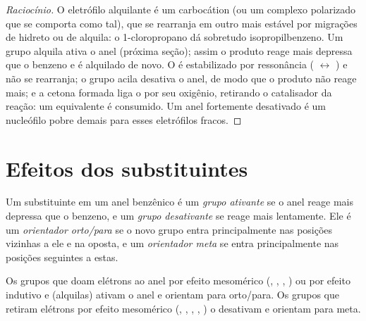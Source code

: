 \begin{proof}[Raciocínio]
O eletrófilo alquilante é um carbocátion (ou um complexo polarizado que se
comporta como tal), que se rearranja em outro mais estável por migrações de
hidreto ou de alquila: o 1-cloropropano dá sobretudo isopropilbenzeno. Um grupo
alquila ativa o anel (próxima seção); assim o produto reage mais depressa que
o benzeno e é alquilado de novo. O  é estabilizado por ressonância
( $\leftrightarrow$ ) e não se rearranja; o grupo acila
desativa o anel, de modo que o produto não reage mais; e a cetona formada liga
o  por seu oxigênio, retirando o catalisador da reação: um
equivalente é consumido. Um anel fortemente desativado é um nucleófilo pobre
demais para esses eletrófilos fracos.
\end{proof}

\section{Efeitos dos substituintes}

\begin{definition}\label{def:b2:aromatic-substitution:directing}
Um substituinte em um anel benzênico é um \emph{grupo ativante} se o
anel reage mais depressa que o benzeno, e um \emph{grupo desativante}
se reage mais lentamente. Ele é um \emph{orientador orto/para} se
o novo grupo entra principalmente nas posições vizinhas a ele e na oposta, e um
\emph{orientador meta} se entra principalmente nas posições
seguintes a estas.
\end{definition}

\begin{proposition}\label{prop:b2:aromatic-substitution:directing}
Os grupos que doam elétrons ao anel por efeito mesomérico (, ,
, ) ou por efeito indutivo e  (alquilas)
ativam o anel e orientam para orto/para. Os grupos que retiram elétrons por
efeito mesomérico (, , , , ) o
desativam e orientam para meta.
\end{proposition}

